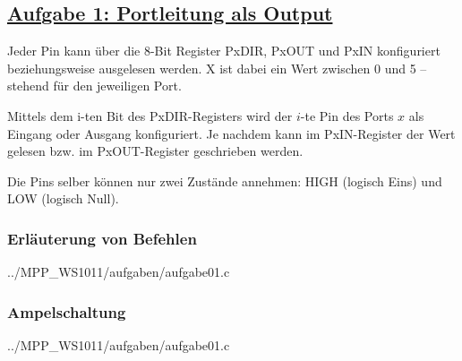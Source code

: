 \subsection*
{\href{http://cst.mi.fu-berlin.de/intern/19606-P-MPP/Aufgaben/040101.html}
{Aufgabe 1: Portleitung als Output}}

Jeder Pin kann über die 8-Bit Register PxDIR, PxOUT und PxIN konfiguriert beziehungsweise ausgelesen werden.
X ist dabei ein Wert zwischen 0 und 5 – stehend für den jeweiligen Port.

Mittels dem i-ten Bit des PxDIR-Registers wird der $i$-te Pin des Ports $x$ als Eingang oder Ausgang konfiguriert.
Je nachdem kann im PxIN-Register der Wert gelesen bzw. im PxOUT-Register geschrieben werden.

Die Pins selber können nur zwei Zustände annehmen: HIGH (logisch Eins) und LOW (logisch Null).
\subsubsection*{Erläuterung von Befehlen}

{../MPP_WS1011/aufgaben/aufgabe01.c}

\subsubsection*{Ampelschaltung}


{../MPP_WS1011/aufgaben/aufgabe01.c}
